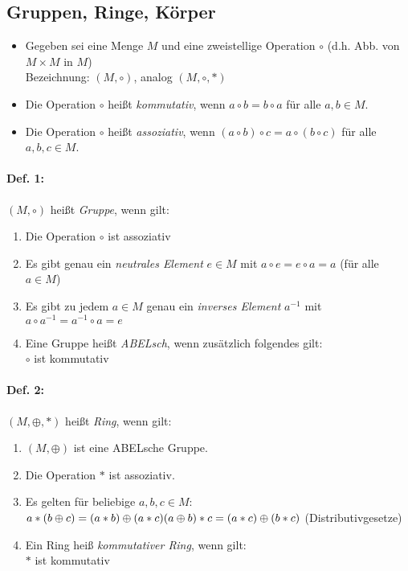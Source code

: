 
\subsection{Gruppen, Ringe, Körper}
\begin{itemize}
\item Gegeben sei eine Menge $M$ und eine zweistellige Operation $\circ$ (d.h. Abb. von $M\times M$ in $M$)\\
Bezeichnung: $(M,\circ)$, analog $(M, \circ, *)$
\item Die Operation $\circ$ heißt \emph{kommutativ}, wenn $a \circ b= b \circ a $ für alle $a, b \in M$.
\item Die Operation $\circ$ heißt \emph{assoziativ}, wenn $(a \circ b) \circ c =a \circ (b \circ c)$ für alle  $a, b, c \in M$.
\end{itemize}

\paragraph{Def. 1:}\parskp
$(M,\circ)$ heißt \emph{Gruppe}, wenn gilt:
\begin{enumerate}
\item Die Operation $\circ$ ist assoziativ
\item Es gibt genau ein \emph{neutrales Element} $e\in M$ mit $a\circ e = e\circ a = a$ (für alle $a \in M$)
\item Es gibt zu jedem $a \in M$ genau ein \emph{inverses Element} $a^{-1}$ mit $a\circ a^{-1}=a^{-1}\circ a = e$
\item Eine Gruppe heißt \emph{ABELsch}, wenn zusätzlich folgendes gilt:\\
$\circ$ ist kommutativ
\end{enumerate}

\paragraph{Def. 2:}\parskp
$(M,\oplus,*)$ heißt \emph{Ring}, wenn gilt:
\begin{enumerate}
\item $(M, \oplus)$ ist eine ABELsche Gruppe.
\item Die Operation $*$ ist assoziativ.
\item Es gelten für beliebige $a,b,c\in M$:\\
$a*(b\oplus c)=(a*b)\oplus (a*c)\\
(a \oplus b) *c = (a*c) \oplus (b*c)$ \qquad (Distributivgesetze)
\item Ein Ring heiß \emph{kommutativer Ring}, wenn gilt:\\
$*$ ist kommutativ
\end{enumerate}

